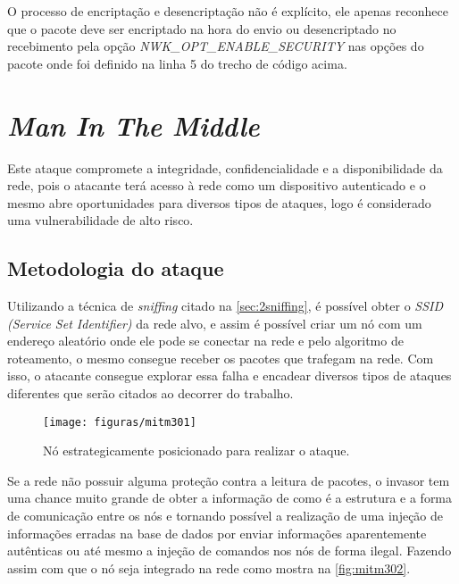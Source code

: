 \par O processo de encriptação e desencriptação não é explícito, ele apenas reconhece que o pacote deve ser encriptado na hora do envio ou desencriptado no recebimento pela opção \emph{NWK\_OPT\_ENABLE\_SECURITY} nas opções do pacote onde foi definido na linha 5 do trecho de c\'odigo acima.


\section{\emph{Man In The Middle}}
\label{sec:3mitm}
\par Este ataque compromete a integridade, confidencialidade e a disponibilidade da rede, pois o atacante ter\'a acesso \`a rede como um dispositivo autenticado e o mesmo abre oportunidades para diversos tipos de ataques, logo \'e considerado uma vulnerabilidade de alto risco.

\subsection{Metodologia do ataque}
\par Utilizando a técnica de \emph{sniffing} citado na \autoref{sec:2sniffing}, é possível obter o \emph{SSID (Service Set Identifier)} da rede alvo, e assim é possível criar um nó com um endereço aleatório onde ele pode se conectar na rede e pelo algoritmo de roteamento, o mesmo consegue receber os pacotes que trafegam na rede. Com isso, o atacante consegue explorar essa falha e encadear diversos tipos de ataques diferentes que ser\~ao citados ao decorrer do trabalho.

\begin{figure}[ht]
	\centering
	\caption{N\'o estrategicamente posicionado para realizar o ataque.}
	\texttt{[image: figuras/mitm301]}
    \label{fig:mitm301}
\end{figure}

\par Se a rede n\~ao possuir alguma prote\c{c}\~ao contra a leitura de pacotes, o invasor tem uma chance muito grande de obter a informa\c{c}\~ao de como é a estrutura e a forma de comunicação entre os nós e tornando possível a realiza\c{c}\~ao de uma injeção de informações erradas na base de dados por enviar informações aparentemente autênticas ou at\'e mesmo a inje\c{c}\~ao de comandos nos n\'os de forma ilegal. Fazendo assim com que o n\'o seja integrado na rede como mostra na \autoref{fig:mitm302}.

